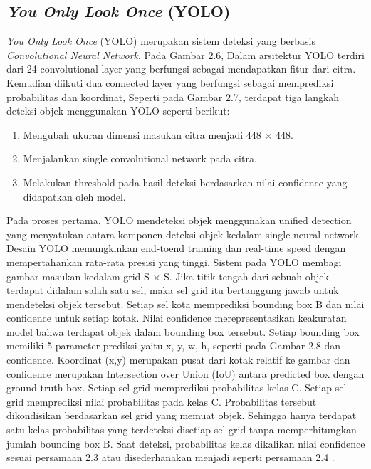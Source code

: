 \subsection{\emph{You Only Look Once} (YOLO)}
\label{sec:YOLO}
\emph{You Only Look Once} (YOLO) merupakan sistem deteksi yang
berbasis \emph{Convolutional Neural Network}. Pada Gambar 2.6, Dalam
arsitektur YOLO terdiri dari 24 convolutional layer yang berfungsi sebagai mendapatkan fitur dari citra. Kemudian diikuti dua connected layer yang berfungsi sebagai memprediksi probabilitas dan
koordinat, Seperti pada Gambar 2.7, terdapat tiga langkah deteksi objek menggunakan YOLO seperti berikut:
\begin{enumerate}
  \item Mengubah ukuran dimensi masukan citra menjadi 448 × 448.
  \item Menjalankan single convolutional network pada citra.
  \item Melakukan threshold pada hasil deteksi berdasarkan nilai confidence yang didapatkan oleh model.
\end{enumerate}

Pada proses pertama, YOLO mendeteksi objek menggunakan unified detection yang menyatukan antara komponen deteksi objek kedalam single neural network. Desain YOLO memungkinkan end-toend training dan real-time speed dengan mempertahankan rata-rata
presisi yang tinggi. Sistem pada YOLO membagi gambar masukan
kedalam grid S × S. Jika titik tengah dari sebuah objek terdapat
didalam salah satu sel, maka sel grid itu bertanggung jawab untuk
mendeteksi objek tersebut. Setiap sel kota memprediksi bounding
box B dan nilai confidence untuk setiap kotak. Nilai confidence
merepresentasikan keakuratan model bahwa terdapat objek dalam
bounding box tersebut. Setiap bounding box memiliki 5 parameter
prediksi yaitu x, y, w, h, seperti pada Gambar 2.8 dan confidence.
Koordinat (x,y) merupakan pusat dari kotak relatif ke gambar dan
confidence merupakan Intersection over Union (IoU) antara predicted box dengan ground-truth box. Setiap sel grid memprediksi
probabilitas kelas C. Setiap sel grid memprediksi nilai probabilitas
pada kelas C. Probabilitas tersebut dikondisikan berdasarkan sel
grid yang memuat objek. Sehingga hanya terdapat satu kelas probabilitas yang terdeteksi disetiap sel grid tanpa memperhitungkan
jumlah bounding box B. Saat deteksi, probabilitas kelas dikalikan
nilai confidence sesuai persamaan 2.3 atau disederhanakan menjadi seperti persamaan 2.4 \citep{yolo}.

